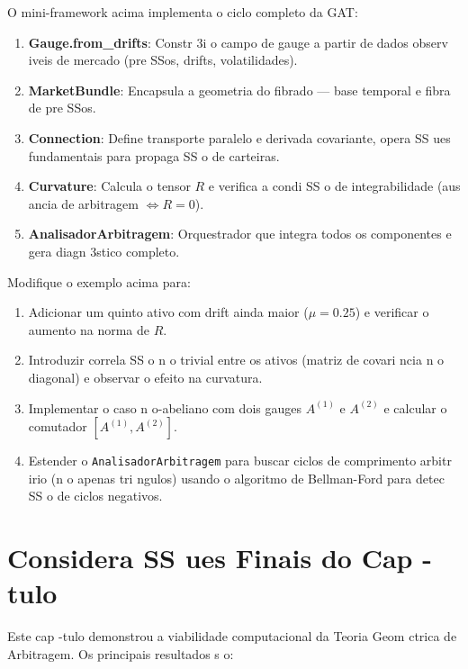 \begin{defi}
O mini-framework acima implementa o ciclo completo da GAT:
\begin{enumerate}
 \item \textbf{Gauge.from\_drifts}: Constr 3i o campo de gauge a partir de dados observ iveis de mercado (pre SSos, drifts, volatilidades).
 \item \textbf{MarketBundle}: Encapsula a geometria do fibrado --- base temporal e fibra de pre SSos.
 \item \textbf{Connection}: Define transporte paralelo e derivada covariante, opera SS ues fundamentais para propaga SS o de carteiras.
 \item \textbf{Curvature}: Calcula o tensor \(R\) e verifica a condi SS o de integrabilidade (aus ancia de arbitragem \(\iff R = 0\)).
 \item \textbf{AnalisadorArbitragem}: Orquestrador que integra todos os componentes e gera diagn 3stico completo.
\end{enumerate}
\end{defi}

\begin{ex}
Modifique o exemplo acima para:
\begin{enumerate}
 \item Adicionar um quinto ativo com drift ainda maior (\(\mu = 0.25\)) e verificar o aumento na norma de \(R\).
 \item Introduzir correla SS o n o trivial entre os ativos (matriz de covari ncia n o diagonal) e observar o efeito na curvatura.
 \item Implementar o caso n o-abeliano com dois gauges \(A^{(1)}\) e \(A^{(2)}\) e calcular o comutador \([A^{(1)}, A^{(2)}]\).
 \item Estender o \texttt{AnalisadorArbitragem} para buscar ciclos de comprimento arbitr irio (n o apenas tri ngulos) usando o algoritmo de Bellman-Ford para detec SS o de ciclos negativos.
\end{enumerate}
\end{ex}

\section{Considera SS ues Finais do Cap -tulo}
\label{sec:consideracoes-finais-comp}

Este cap -tulo demonstrou a viabilidade computacional da Teoria Geom ctrica de Arbitragem. Os principais resultados s o:

